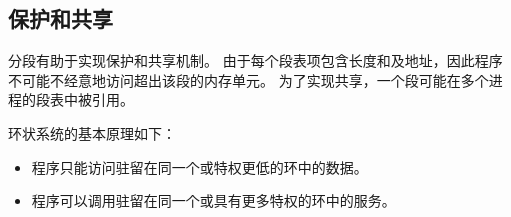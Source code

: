 {    \subsection{保护和共享}
    {
        分段有助于实现保护和共享机制。
        由于每个段表项包含长度和及地址，因此程序不可能不经意地访问超出该段的内存单元。
        为了实现共享，一个段可能在多个进程的段表中被引用。

        环状系统的基本原理如下：

        \begin{itemize}
            \item 程序只能访问驻留在同一个或特权更低的环中的数据。
            \item 程序可以调用驻留在同一个或具有更多特权的环中的服务。
        \end{itemize}
    }
}
